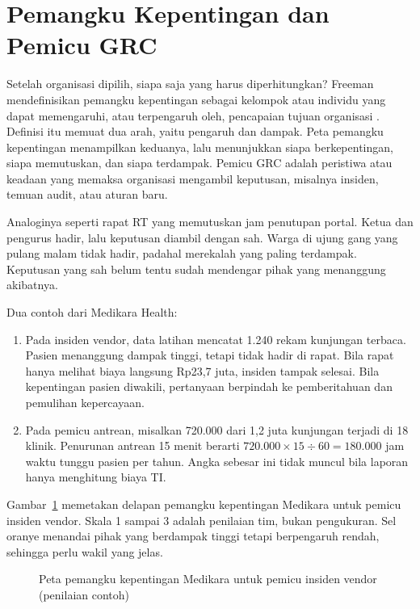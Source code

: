 \section{Pemangku Kepentingan dan Pemicu GRC}

Setelah organisasi dipilih, siapa saja yang harus diperhitungkan? Freeman mendefinisikan
pemangku kepentingan sebagai kelompok atau individu yang dapat
memengaruhi, atau terpengaruh oleh, pencapaian tujuan organisasi \cite{c01-freeman2010}.
Definisi itu memuat dua arah, yaitu pengaruh dan dampak. Peta pemangku kepentingan menampilkan
keduanya, lalu menunjukkan siapa berkepentingan, siapa memutuskan, dan siapa terdampak. Pemicu
GRC adalah peristiwa atau keadaan yang memaksa organisasi mengambil keputusan, misalnya
insiden, temuan audit, atau aturan baru.

Analoginya seperti rapat RT yang memutuskan jam penutupan portal. Ketua dan pengurus hadir,
lalu keputusan diambil dengan sah. Warga di ujung gang yang pulang malam tidak hadir, padahal
merekalah yang paling terdampak. Keputusan yang sah belum tentu sudah mendengar pihak yang
menanggung akibatnya.

Dua contoh dari Medikara Health:
\begin{enumerate}
  \item Pada insiden vendor, data latihan mencatat 1.240 rekam kunjungan terbaca. Pasien
  menanggung dampak tinggi, tetapi tidak hadir di rapat. Bila rapat hanya melihat biaya
  langsung Rp23,7 juta, insiden tampak selesai. Bila kepentingan pasien diwakili, pertanyaan
  berpindah ke pemberitahuan dan pemulihan kepercayaan.
  \item Pada pemicu antrean, misalkan 720.000 dari 1,2 juta kunjungan terjadi di 18 klinik.
  Penurunan antrean 15 menit berarti $720.000 \times 15 \div 60 = 180.000$ jam waktu tunggu
  pasien per tahun. Angka sebesar ini tidak muncul bila laporan hanya menghitung biaya TI.
\end{enumerate}

Gambar~\ref{fig:ch01-peta-pemangku} memetakan delapan pemangku kepentingan Medikara untuk
pemicu insiden vendor. Skala 1 sampai 3 adalah penilaian tim, bukan pengukuran. Sel oranye
menandai pihak yang berdampak tinggi tetapi berpengaruh rendah, sehingga perlu wakil yang
jelas.

\begin{figure}[!htb]
  \centering
  
  \caption{Peta pemangku kepentingan Medikara untuk pemicu insiden vendor (penilaian contoh)}
  \label{fig:ch01-peta-pemangku}
\end{figure}

